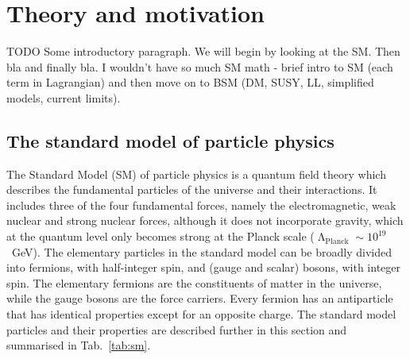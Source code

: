 \chapter{Theory and motivation}
\label{chap:theory}



TODO Some introductory paragraph. We will begin by looking at the SM. Then bla 
and finally bla. I wouldn’t have so much SM math - brief intro to SM (each term 
in Lagrangian) and then move on to BSM (DM, SUSY, LL, simplified models, 
current limits).

\section{The standard model of particle physics}
\label{sec:theory-sm}

The Standard Model (SM) of particle physics is a quantum field theory which 
describes the fundamental particles of the universe and their interactions. It 
includes three of the four fundamental forces, namely the electromagnetic, weak 
nuclear and strong nuclear forces, although it does not incorporate gravity, 
which at the quantum level only becomes strong at the Planck scale 
($\upLambda_{\mathrm{Planck}} \sim 10^{19}$~GeV). 
The elementary particles in the standard model can be broadly divided into 
fermions, with half-integer spin, and (gauge and scalar) bosons, with integer 
spin. The elementary fermions are the constituents of matter in the universe, 
while the gauge bosons are the force carriers. 
Every fermion has an antiparticle that has identical properties except for 
an opposite charge.
The standard model particles and their properties are described further in this 
section and summarised in Tab.~\ref{tab:sm}.

